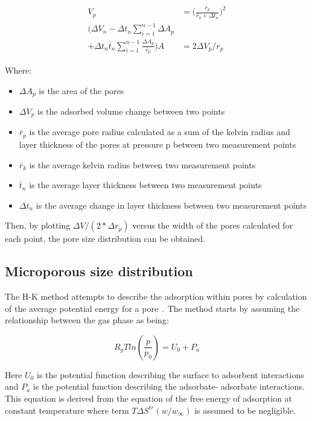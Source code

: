 \begin{align}
    V_p & = \Big( \frac{\bar{r}_p}{\bar{r}_k + \Delta t_n} \Big)^2 \\
    (\Delta V_n - \Delta t_n \sum_{i=1}^{n-1} \Delta A_p \\
    + \Delta t_n \bar{t}_n \sum_{i=1}^{n-1} \frac{\Delta A_p}{\bar{r}_p})
    A & = 2 \Delta V_p / r_p
\end{align}

Where:

\begin{itemize}
    
    \item \(\Delta A_p\) is the area of the pores
    \item \(\Delta V_p\) is the adsorbed volume change between two points
    \item \(\bar{r}_p\) is the average pore radius calculated as a sum of the
    kelvin radius and layer thickness of the pores at pressure p between two
    measurement points
    \item \(\bar{r}_k\) is the average kelvin radius between two measurement points
    \item \(\bar{t}_n\) is the average layer thickness between two measurement points
    \item \(\Delta t_n\) is the average change in layer thickness between two measurement points
    
\end{itemize}

Then, by plotting \(\Delta V / (2*\Delta r_p)\) versus the width of the pores calculated
for each point, the pore size distribution can be obtained.

\subsection{Microporous size distribution}

The H-K method attempts to describe the adsorption within pores by calculation
of the average potential energy for a pore~\cite{horvathMethodCalculationEffective1983}.
The method starts by assuming the
relationship between the gas phase as being:

\begin{equation}
    R_g T ln(\frac{p}{p_0}) = U_0 + P_a
\end{equation}

Here \(U_0\) is the potential function describing the surface to adsorbent
interactions and \(P_a\) is the potential function describing the adsorbate-
adsorbate interactions. This equation is derived from the equation of the free energy
of adsorption at constant temperature where term \(T \Delta S^{tr}(w/w_{\infty})\)
is assumed to be negligible.

